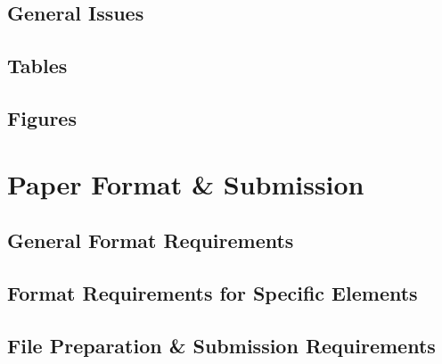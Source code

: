 \documentclass[oneside]{book}
\numberwithin{equation}{section}
\begin{document}
\section{General Issues}

\section{Tables}

\section{Figures}


\appendix

\chapter{Paper Format \& Submission}

\section{General Format Requirements}

\section{Format Requirements for Specific Elements}

\section{File Preparation \& Submission Requirements}


\printbibliography[heading=bibintoc]
\end{document}
